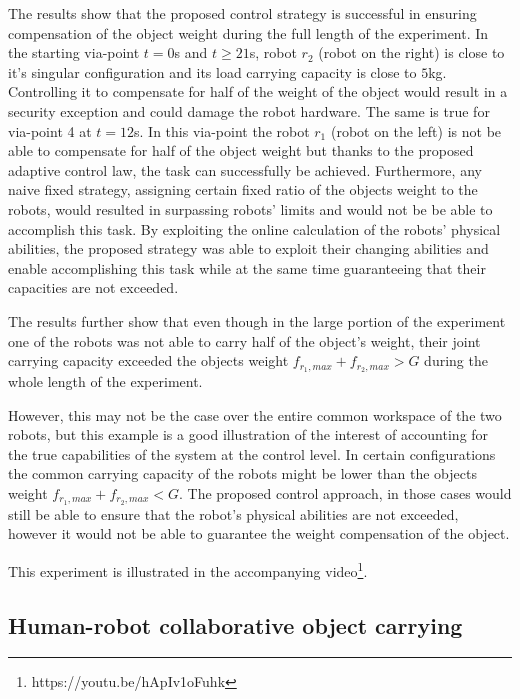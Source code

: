 The results show that the proposed control strategy is successful in ensuring compensation of the object weight during the full length of the experiment. In the starting via-point $t=0$s and $t\geq21$s, robot $r_2$ (robot on the right) is close to it's singular configuration and its load carrying capacity is close to $5$kg. Controlling it to compensate for half of the weight of the object would result in a security exception and could damage the robot hardware. The same is true for via-point 4 at $t=12$s. In this via-point the robot $r_1$ (robot on the left) is not be able to compensate for half of the object weight but thanks to the proposed adaptive control law, the task can successfully be achieved. 
Furthermore, any naive fixed strategy, assigning certain fixed ratio of the objects weight to the robots, would resulted in surpassing robots' limits and would not be be able to accomplish this task. By exploiting the online calculation of the robots' physical abilities, the proposed strategy was able to exploit their changing abilities and enable accomplishing this task while at the same time guaranteeing that their capacities are not exceeded.

The results further show that even though in the large portion of the experiment one of the robots was not able to carry half of the object's weight, their joint carrying capacity exceeded the objects weight $f_{r_1,max}+f_{r_2,max} >G$ during the whole length of the experiment. 

However, this may not be the case over the entire common workspace of the two robots, but this example is a good illustration of the interest of accounting for the true capabilities of the system at the control level.  In certain configurations the common carrying capacity of the robots might be lower than the objects weight $f_{r_1,max}+f_{r_2,max} <G$. The proposed control approach, in those cases would still be able to ensure that the robot's physical abilities are not exceeded, however it would not be able to guarantee the weight compensation of the object. 

This experiment is illustrated in the accompanying video\footnote{https://youtu.be/hApIv1oFuhk}.


\subsection{Human-robot collaborative object carrying}
\label{ch:human_robot_carrying}

